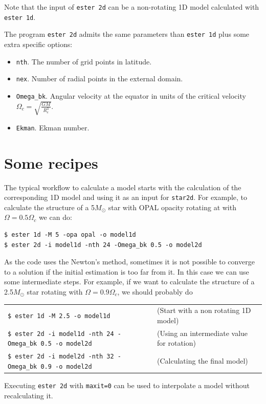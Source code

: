 Note that the input of {\tt ester 2d} can be a non-rotating 1D model calculated 
with {\tt ester 1d}.

The program {\tt ester 2d} admits the same parameters than {\tt ester 1d}
plus some extra specific options:

\begin{itemize}
\item {\tt nth}. The number of grid points in latitude.
\item {\tt nex}. Number of radial points in the external domain.
\item {\tt Omega\_bk}. Angular velocity at the equator in units of the critical velocity
$\Omega_c=\sqrt{\frac{GM}{R_e^3}}$.
\item {\tt Ekman}. Ekman number.
\end{itemize}

\section{Some recipes}

The typical workflow to calculate a model starts with the calculation of
the corresponding 1D model and using it as an input for {\tt star2d}. For
example, to calculate the structure of a 5$M_\odot$ star with OPAL
opacity rotating at with $\Omega=0.5\Omega_c$ we can do:

\begin{verbatim}
$ ester 1d -M 5 -opa opal -o model1d
$ ester 2d -i model1d -nth 24 -Omega_bk 0.5 -o model2d
\end{verbatim}

As the code uses the Newton's method, sometimes it is not possible
to converge to a solution if the initial estimation is too far from
it. In this case we can use some intermediate steps.  For example, if
we want to calculate the structure of a 2.5$M_\odot$ star rotating with
$\Omega=0.9\Omega_c$, we should probably do

\medskip
\noindent\begin{tabular}{lp{4.5cm}}
\verb|$ ester 1d -M 2.5 -o model1d |  
&(Start with a non rotating 1D model)\\
\verb|$ ester 2d -i model1d -nth 24 -Omega_bk 0.5 -o model2d| &	
(Using an intermediate value for rotation) \\
\verb|$ ester 2d -i model2d -nth 32 -Omega_bk 0.9 -o model2d| &	
(Calculating the final model) 
\end{tabular}
\medskip

Executing {\tt ester 2d} with {\tt maxit=0} can be used to interpolate a
model without recalculating it.

